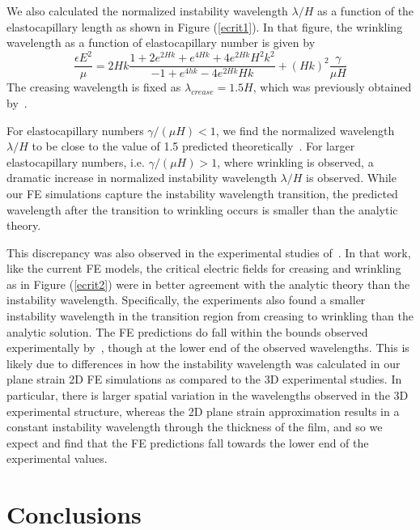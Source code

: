 \documentclass[8.5pt,twoside,twocolumn]{article}
\begin{document}
We also calculated the normalized instability wavelength $\lambda/H$ as a function of the elastocapillary length as shown in Figure (\ref{ecrit1}).  In that figure, the wrinkling wavelength as a function of elastocapillary number is given by
\begin{equation} \label{eqn:wrinkle}
\frac{\epsilon E^2}{\mu}=2Hk\frac{1+2e^{2Hk}+e^{4Hk}+4e^{2Hk}H^2k^2}{-1+e^{4hk}-4e^{2Hk}Hk}+\left(Hk\right)^2\frac{\gamma}{\mu H}
\end{equation}
The creasing wavelength is fixed as $\lambda_{crease}=1.5H$, which was previously obtained by~\citet{wangPRE2013}.

For elastocapillary numbers $\gamma/(\mu H)<1$, we find the normalized wavelength $\lambda/H$ to be close to the value of 1.5 predicted theoretically~\cite{wangPRE2013}.  For larger elastocapillary numbers, i.e. $\gamma/(\mu H)>1$, where wrinkling is observed, a dramatic increase in normalized instability wavelength $\lambda/H$ is observed.  While our FE simulations capture the instability wavelength transition, the predicted wavelength after the transition to wrinkling occurs is smaller than the analytic theory.  

This discrepancy was also observed in the experimental studies of~\citet{wangPRE2013}.  In that work, like the current FE models, the critical electric fields for creasing and wrinkling as in Figure (\ref{ecrit2}) were in better agreement with the analytic theory than the instability wavelength.  Specifically, the experiments also found a smaller instability wavelength in the transition region from creasing to wrinkling than the analytic solution.  The FE predictions do fall within the bounds observed experimentally by~\citet{wangPRE2013}, though at the lower end of the observed wavelengths.  This is likely due to differences in how the instability wavelength was calculated in our plane strain 2D FE simulations as compared to the 3D experimental studies.  In particular, there is larger spatial variation in the wavelengths observed in the 3D experimental structure, whereas the 2D plane strain approximation results in a constant instability wavelength through the thickness of the film, and so we expect and find that the FE predictions fall towards the lower end of the experimental values.

\section{Conclusions}
\end{document}
